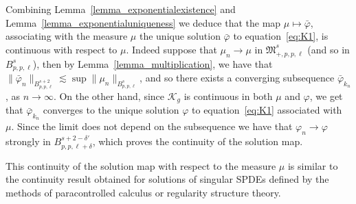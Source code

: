 \documentclass[a4paper,10pt]{article}
\begin{document}
\begin{remark}
  Combining Lemma~\ref{lemma_exponentialexistence} and
  Lemma~\ref{lemma_exponentialuniqueness} we deduce that the map $\mu
  \longmapsto \bar{\varphi}$, associating with the measure $\mu$ the unique
  solution $\bar{\varphi}$ to equation~{\eqref{eq:K1}}, is continuous with
  respect to $\mu$. Indeed suppose that $\mu_n \rightarrow \mu$ in
  $\mathfrak{M}^s_{+, p, p, \ell}$ (and so in $B^s_{p, p, \ell}$), then by
  Lemma~\ref{lemma_multiplication}, we have that $\| \bar{\varphi}_n \|_{B^{s
  + 2}_{p, p, \ell}} \lesssim \sup \| \mu_n \|_{B^s_{p, p, \ell}}$, and so
  there exists a converging subsequence $\bar{\varphi}_{k_n}$, as $n
  \rightarrow \infty$. On the other hand, since $\mathcal{K}_g$ is continuous
  in both $\mu$ and $\varphi$, we get that $\bar{\varphi}_{k_n}$ converges to
  the unique solution $\varphi$ to equation~{\eqref{eq:K1}} associated with
  $\mu .$ Since the limit does not depend on the subsequence we have that
  $\varphi_n \rightarrow \varphi$ strongly in $B^{s + 2 - \delta'}_{p, p, \ell
  + \delta}$, which proves the continuity of the solution map.
  
  This continuity of the solution map with respect to the measure $\mu$ is
  similar to the continuity result obtained for solutions of singular SPDEs
  defined by the methods of paracontrolled calculus or regularity structure
  theory. 
\end{remark}
\end{document}
